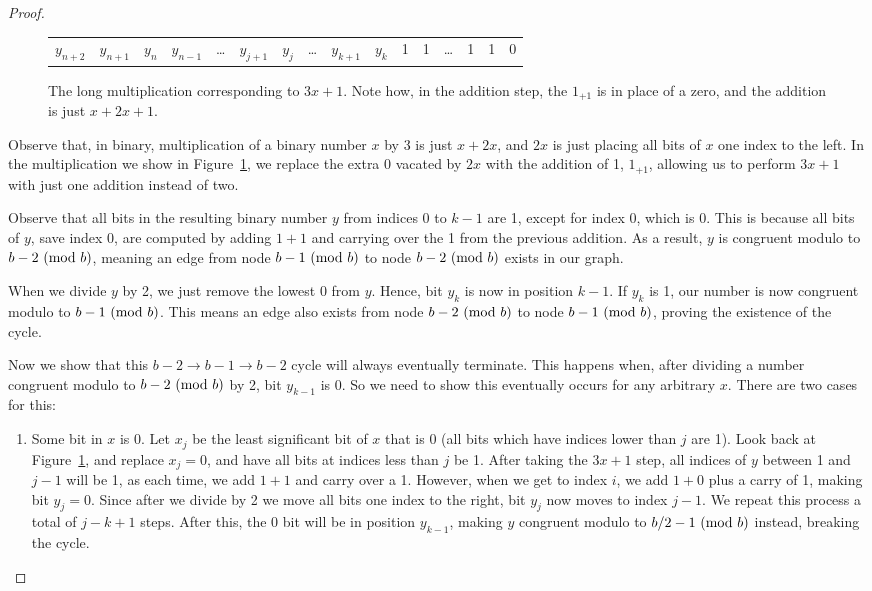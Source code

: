 \begin{proof}
\begin{figure}
\begin{tabular}{*{16}c}
  \hline
  $ y_{n+2}$  & $ y_{n+1}$  & $ y_{n}$  & $ y_{n-1}$  & \ldots & $ y_{j+1}$  & $ y_{j}$  & \ldots & $ y_{k+1}$  & $ y_{k}$  & 1 & 1 & \ldots & 1 & 1 & 0 
\end{tabular}
\caption{The long multiplication corresponding to $3x + 1$. Note how, in the addition step, the $1_{+1}$ is in place of a zero, and the addition is just $x + 2x + 1$.}
\label{fig:mul}
\end{figure}
Observe that, in binary, multiplication of a binary number $x$ by 3 is just $x + 2x$, and $2x$ is just placing all bits of $x$ one index to the left. In the multiplication we show in Figure~\ref{fig:mul}, we replace the extra 0 vacated by $2x$ with the addition of 1, $1_{+1}$, allowing us to perform $3x+1$ with just one addition instead of two. \par
Observe that all bits in the resulting binary number $y$ from indices 0 to $k-1$ are 1, except for index 0, which is 0. This is because all bits of $y$, save index 0, are computed by adding $1+1$ and carrying over the 1 from the previous addition. As a result, $y$ is congruent modulo to $b-2 \ (\mathrm{mod}\ b)$, meaning an edge from node $b-1 \ (\mathrm{mod}\ b)$ to node $b-2 \ (\mathrm{mod}\ b)$ exists in our graph.\par
When we divide $y$ by 2, we just remove the lowest 0 from $y$. Hence, bit $y_k$ is now in position $k-1$. If $y_k$ is 1, our number is now congruent modulo to $b-1 \ (\mathrm{mod}\ b)$. This means an edge also exists from node $b-2 \ (\mathrm{mod}\ b)$ to node $b-1 \ (\mathrm{mod}\ b)$, proving the existence of the cycle. \par
Now we show that this $b-2 \rightarrow b-1 \rightarrow b-2$ cycle will always eventually terminate. This happens when, after dividing a number congruent modulo to $b-2 \ (\mathrm{mod}\ b)$ by 2, bit $y_{k-1}$ is 0. So we need to show this eventually occurs for any arbitrary $x$. There are two cases for this:
\begin{enumerate}
    \item Some bit in $x$ is 0. Let $x_j$ be the least significant bit of $x$ that is 0 (all bits which have indices lower than $j$ are 1). Look back at Figure~\ref{fig:mul}, and replace $x_j = 0$, and have all bits at indices less than $j$ be 1. After taking the $3x+1$ step, all indices of $y$ between 1 and $j-1$ will be 1, as each time, we add $1 + 1$ and carry over a 1. However, when we get to index $i$, we add $1 + 0$ plus a carry of 1, making bit $y_j = 0$. Since after we divide by 2 we move all bits one index to the right, bit $y_j$ now moves to index $j-1$. We repeat this process a total of $j-k+1$ steps. After this, the 0 bit will be in position $y_{k-1}$, making $y$ congruent modulo to $b/2 - 1 \ (\mathrm{mod}\ b)$ instead, breaking the cycle.

\end{enumerate}
\end{proof}
